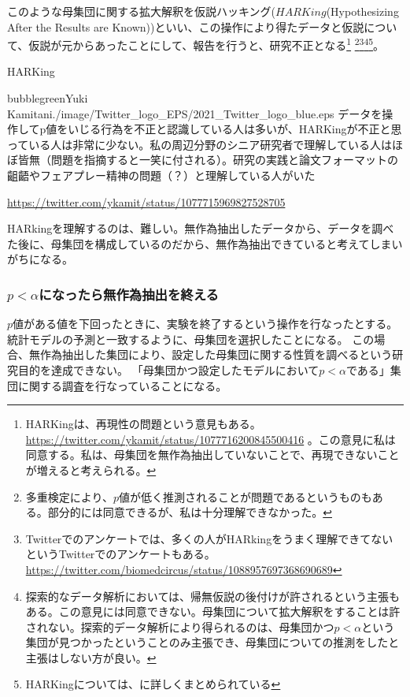 このような母集団に関する拡大解釈を仮説ハッキング($HARKing$(Hypothesizing After the Results are Known))といい、この操作により得たデータと仮説について、仮説が元からあったことにして、報告を行うと、研究不正となる\footnote{
    HARKingは、再現性の問題という意見もある。
    \url{https://twitter.com/ykamit/status/1077716200845500416} 。この意見に私は同意する。私は、母集団を無作為抽出していないことで、再現できないことが増えると考えられる。
}
\footnote{
    多重検定により、$p$値が低く推測されることが問題であるというものもある\cite{池田_功毅2016,中村_大輝2021sp20016}。部分的には同意できるが、私は十分理解できなかった。
}\footnote{
    Twitterでのアンケートでは、多くの人がHARkingをうまく理解できてないというTwitterでのアンケートもある。
    \url{https://twitter.com/biomedcircus/status/1088957697368690689}
}\footnote{
    探索的なデータ解析においては、帰無仮説の後付けが許されるという主張もある。この意見には同意できない。母集団について拡大解釈をすることは許されない。探索的データ解析により得られるのは、母集団かつ$p<\alpha$という集団が見つかったということのみ主張でき、母集団についての推測をしたと主張はしない方が良い。
}\footnote{
    HARKingについては、\cite{kerr1998harking}に詳しくまとめられている
}。



\begin{SMbox}{HARKing}
    \begin{rightbubbles}{bubblegreen}{Yuki Kamitani}{./image/Twitter_logo_EPS/2021_Twitter_logo_blue.eps}
    データを操作してp値をいじる行為を不正と認識している人は多いが、HARKingが不正と思っている人は非常に少ない。私の周辺分野のシニア研究者で理解している人はほぼ皆無（問題を指摘すると一笑に付される）。研究の実践と論文フォーマットの齟齬やフェアプレー精神の問題（？）と理解している人がいた
        \begin{flushright} 
            \small	\url{https://twitter.com/ykamit/status/1077715969827528705}
        \end{flushright}    
    \end{rightbubbles}

    HARkingを理解するのは、難しい。無作為抽出したデータから、データを調べた後に、母集団を構成しているのだから、無作為抽出できていると考えてしまいがちになる。
  \end{SMbox}
  

\subsubsection{$p<\alpha$になったら無作為抽出を終える}
$p$値がある値を下回ったときに、実験を終了するという操作を行なったとする。
統計モデルの予測と一致するように、母集団を選択したことになる。
この場合、無作為抽出した集団により、設定した母集団に関する性質を調べるという研究目的を達成できない。
「母集団かつ設定したモデルにおいて$p<\alpha$である」集団に関する調査を行なっていることになる。

